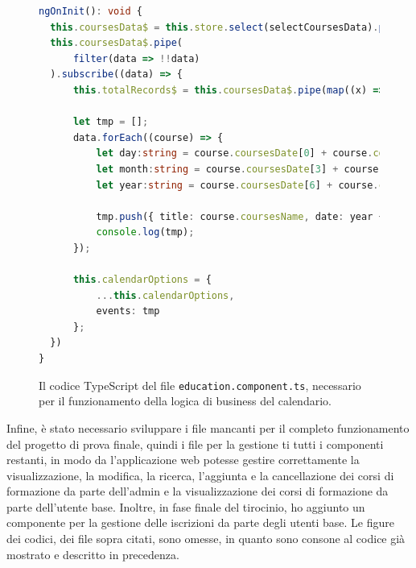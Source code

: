 \begin{figure}[H]
\centering
\begin{lstlisting}[language=TypeScript, linewidth=20cm, basicstyle=\tiny]
ngOnInit(): void {
  this.coursesData$ = this.store.select(selectCoursesData).pipe(startWith(this.route.snapshot.data.CoursesData));
  this.coursesData$.pipe(
      filter(data => !!data)
  ).subscribe((data) => {
      this.totalRecords$ = this.coursesData$.pipe(map((x) => (x ? (x[0] ? x[0].count : 0) : 0)));

      let tmp = [];
      data.forEach((course) => {
          let day:string = course.coursesDate[0] + course.coursesDate[1];
          let month:string = course.coursesDate[3] + course.coursesDate[4];
          let year:string = course.coursesDate[6] + course.coursesDate[7] + course.coursesDate[8] + course.coursesDate[9];

          tmp.push({ title: course.coursesName, date: year + '-' + month + '-' + day }); // yyy-mm-dd
          console.log(tmp);
      });

      this.calendarOptions = {
          ...this.calendarOptions,
          events: tmp
      };
  })
}
\end{lstlisting}
\caption{\label{fig:fullcalendar.ts}Il codice TypeScript del file \texttt{education.component.ts}, necessario per il funzionamento della logica di business del calendario.}
\end{figure}



Infine, è stato necessario sviluppare i file mancanti per il completo funzionamento del progetto di prova finale, quindi i file per la gestione ti tutti i componenti restanti, in modo da l'applicazione web potesse gestire correttamente la visualizzazione, la modifica, la ricerca, l'aggiunta e la cancellazione dei corsi di formazione da parte dell'admin e la visualizzazione dei corsi di formazione da parte dell'utente base. 
Inoltre, in fase finale del tirocinio, ho aggiunto un componente per la gestione delle iscrizioni da parte degli utenti base. 
Le figure dei codici, dei file sopra citati, sono omesse, in quanto sono consone al codice già mostrato e descritto in precedenza.\newline


